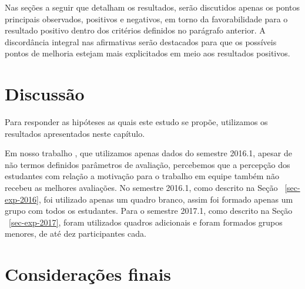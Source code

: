 Nas seções a seguir que detalham os resultados, serão discutidos apenas os
pontos principais observados, positivos e negativos, em torno da
favorabilidade para o resultado positivo dentro dos critérios
definidos no parágrafo anterior.
A discordância integral nas afirmativas serão destacados para que
os possíveis pontos de melhoria estejam mais explicitados em meio
aos resultados positivos.




\section{Discussão}
\label{sec-avaliacao-hipoteses}
Para responder as hipóteses as quais este estudo se propõe, utilizamos
os resultados apresentados neste capítulo.

\AprovacaoHipoteseResultado{}{}{}{}{}

Em nosso trabalho \cite{gavaza2017}, que utilizamos apenas dados do
semestre 2016.1, apesar de não termos definidos parâmetros
de avaliação, percebemos que a percepção dos estudantes com relação
a motivação para o trabalho em equipe também não recebeu as melhores
avaliações.
No semestre 2016.1, como descrito na Seção ~\ref{sec-exp-2016}, foi utilizado
apenas um quadro branco, assim foi formado apenas um grupo com todos
os estudantes.
Para o semestre 2017.1, como descrito na Seção ~\ref{sec-exp-2017}, foram
utilizados quadros adicionais e foram formados grupos menores,
de até dez participantes cada.

\AprovacaoHipoteseResultado{}{}{}{}{}

\section{Considerações finais}
\label{sec-consideracoes-resultados}

